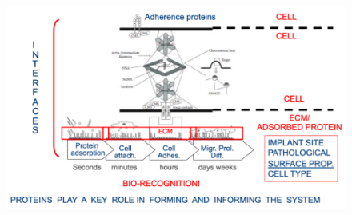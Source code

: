 \begin{figure}[h]
\includegraphics[width=1\textwidth]{interfaces}
\caption{\label{fig:interfaces}}
\end{figure}

